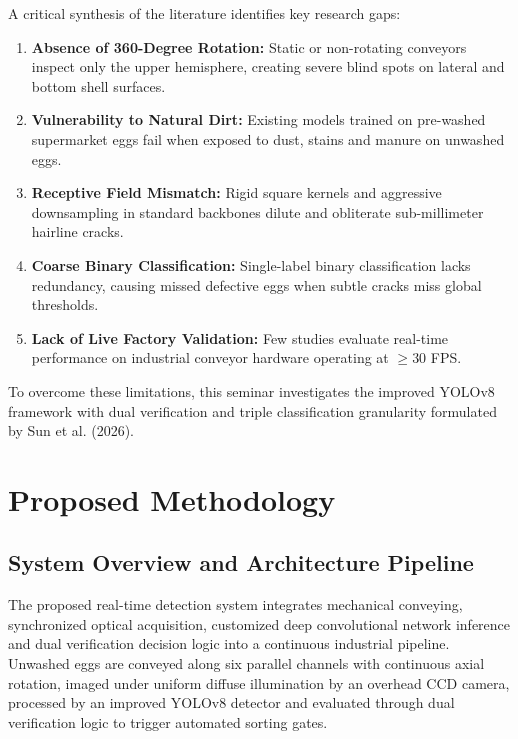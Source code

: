 \documentclass[12pt,a4paper]{report}
\begin{document}
A critical synthesis of the literature identifies key research gaps:
\begin{enumerate}[label=\arabic*.]
    \item \textbf{Absence of 360-Degree Rotation:} Static or non-rotating conveyors inspect only the upper hemisphere, creating severe blind spots on lateral and bottom shell surfaces.
    \item \textbf{Vulnerability to Natural Dirt:} Existing models trained on pre-washed supermarket eggs fail when exposed to dust, stains and manure on unwashed eggs.
    \item \textbf{Receptive Field Mismatch:} Rigid square kernels and aggressive downsampling in standard backbones dilute and obliterate sub-millimeter hairline cracks.
    \item \textbf{Coarse Binary Classification:} Single-label binary classification lacks redundancy, causing missed defective eggs when subtle cracks miss global thresholds.
    \item \textbf{Lack of Live Factory Validation:} Few studies evaluate real-time performance on industrial conveyor hardware operating at $\ge 30$ FPS.
\end{enumerate}

To overcome these limitations, this seminar investigates the improved YOLOv8 framework with dual verification and triple classification granularity formulated by Sun et al. (2026).

\chapter{Proposed Methodology}

\section{System Overview and Architecture Pipeline}

The proposed real-time detection system integrates mechanical conveying, synchronized optical acquisition, customized deep convolutional network inference and dual verification decision logic into a continuous industrial pipeline. Unwashed eggs are conveyed along six parallel channels with continuous axial rotation, imaged under uniform diffuse illumination by an overhead CCD camera, processed by an improved YOLOv8 detector and evaluated through dual verification logic to trigger automated sorting gates.
\end{document}
